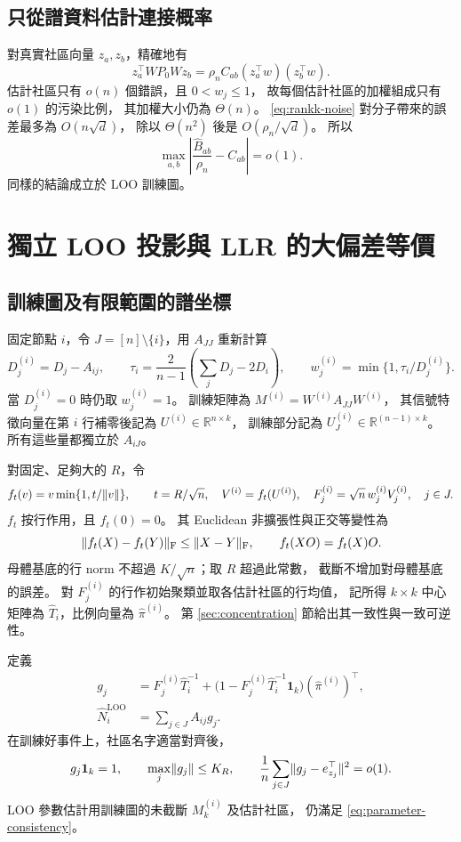 \documentclass[11pt,a4paper]{article}
\theoremstyle{zhplain}
\numberwithin{equation}{section}
\newcommand{\R}{\mathbb R}
\newcommand{\one}{\mathbf 1}
\newcommand{\Frob}{\mathrm{F}}
\DeclarePairedDelimiter{\norm}{\lVert}{\rVert}
\begin{document}
\subsection{只從譜資料估計連接概率}
對真實社區向量 \(z_a,z_b\)，精確地有
\[
 z_a^\top WP_0Wz_b
   =\rho_n C_{ab}(z_a^\top w)(z_b^\top w).
\]
估計社區只有 \(o(n)\) 個錯誤，且 \(0<w_j\le1\)，
故每個估計社區的加權組成只有 \(o(1)\) 的污染比例，
其加權大小仍為 \(\Theta(n)\)。
\eqref{eq:rankk-noise} 對分子帶來的誤差最多為 \(O(n\sqrt d)\)，
除以 \(\Theta(n^2)\) 後是 \(O(\rho_n/\sqrt d)\)。
所以
\begin{equation}
 \max_{a,b}\left|\frac{\hat B_{ab}}{\rho_n}-C_{ab}\right|=o(1).
 \label{eq:parameter-consistency}
\end{equation}
同樣的結論成立於 LOO 訓練圖。

\section{獨立 LOO 投影與 LLR 的大偏差等價}
\label{sec:loo}

\subsection{訓練圖及有限範圍的譜坐標}
固定節點 \(i\)，令 \(J=[n]\setminus\{i\}\)，用 \(A_{JJ}\) 重新計算
\[
 D_j^{(i)}=D_j-A_{ij},\qquad
 \tau_i=\frac{2}{n-1}\left(\sum_jD_j-2D_i\right),\qquad
 w_j^{(i)}=\min\{1,\tau_i/D_j^{(i)}\}.
\]
當 \(D_j^{(i)}=0\) 時仍取 \(w_j^{(i)}=1\)。
訓練矩陣為 \(M^{(i)}=W^{(i)}A_{JJ}W^{(i)}\)，
其信號特徵向量在第 \(i\) 行補零後記為 \(U^{(i)}\in\R^{n\times k}\)，
訓練部分記為 \(U_J^{(i)}\in\R^{(n-1)\times k}\)。
所有這些量都獨立於 \(A_{iJ}\)。

對固定、足夠大的 \(R\)，令
\[
 f_t(v)=v\min\{1,t/\norm v\},\qquad t=R/\sqrt n,
 \quad V^{(i)}=f_t(U^{(i)}),
 \quad F_j^{(i)}=\sqrt n\,w_j^{(i)}V_j^{(i)},\quad j\in J.
\]
\(f_t\) 按行作用，且 \(f_t(0)=0\)。
其 Euclidean 非擴張性與正交等變性為
\begin{equation}
 \norm{f_t(X)-f_t(Y)}_{\Frob}\le\norm{X-Y}_{\Frob},
 \qquad f_t(XO)=f_t(X)O.
 \label{eq:clip-properties}
\end{equation}
母體基底的行 norm 不超過 \(K/\sqrt n\)；取 \(R\) 超過此常數，
截斷不增加對母體基底的誤差。
對 \(F_j^{(i)}\) 的行作初始聚類並取各估計社區的行均值，
記所得 \(k\times k\) 中心矩陣為 \(\hat T_i\)，比例向量為 \(\hat\pi^{(i)}\)。
第 \ref{sec:concentration} 節給出其一致性與一致可逆性。

定義
\begin{align}
 g_j&=F_j^{(i)}\hat T_i^{-1}
   +\bigl(1-F_j^{(i)}\hat T_i^{-1}\one_k\bigr)(\hat\pi^{(i)})^\top,
 \label{eq:g-coefficient}\\
 \hat N_i^{\mathrm{LOO}}
   &=\sum_{j\in J}A_{ij}g_j.
 \label{eq:loo-count}
\end{align}
在訓練好事件上，社區名字適當對齊後，
\begin{equation}
 g_j\one_k=1,\qquad
 \max_j\norm{g_j}\le K_R,\qquad
 \frac1n\sum_{j\in J}\norm{g_j-e_{z_j}^\top}^2=o(1).
 \label{eq:g-consistency}
\end{equation}
LOO 參數估計用訓練圖的未截斷 \(M_k^{(i)}\) 及估計社區，
仍滿足 \eqref{eq:parameter-consistency}。
\end{document}
